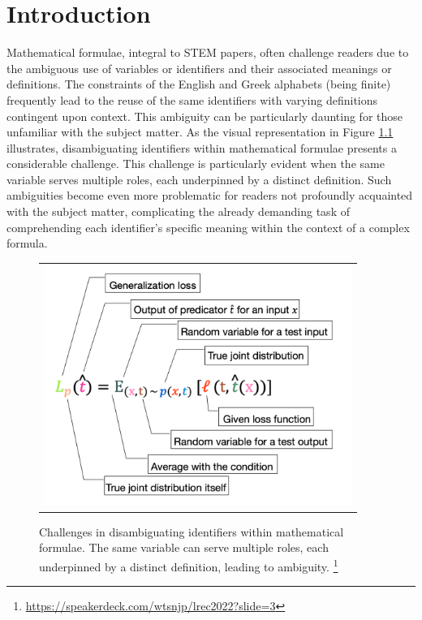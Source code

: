 \chapter{Introduction}\label{chapter:introduction}

Mathematical formulae, integral to \ac{STEM} papers, often challenge readers due to the ambiguous use of variables or identifiers and their associated meanings or definitions. The constraints of the English and Greek alphabets (being finite) frequently lead to the reuse of the same identifiers with varying definitions contingent upon context. This ambiguity can be particularly daunting for those unfamiliar with the subject matter. As the visual representation in Figure \ref{fig:introduction-motivation} illustrates, disambiguating identifiers within mathematical formulae presents a considerable challenge. This challenge is particularly evident when the same variable serves multiple roles, each underpinned by a distinct definition. Such ambiguities become even more problematic for readers not profoundly acquainted with the subject matter, complicating the already demanding task of comprehending each identifier's specific meaning within the context of a complex formula.

\begin{figure}[htpb]
  \centering
  \begin{tabular}{c}
    \includegraphics[width=10cm]{images/introduction-motivation.png}
  \end{tabular}
  \caption[Challenges in Disambiguation]{Challenges in disambiguating identifiers within mathematical formulae. The same variable can serve multiple roles, each underpinned by a distinct definition, leading to ambiguity. \footnote{\url{https://speakerdeck.com/wtsnjp/lrec2022?slide=3}}}\label{fig:introduction-motivation}
\end{figure}

